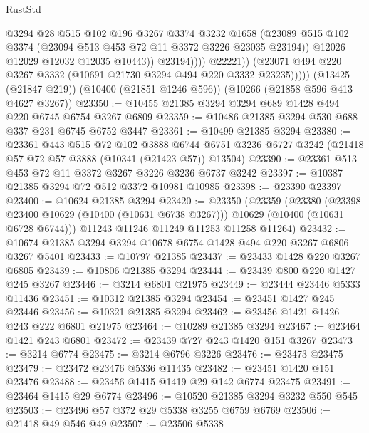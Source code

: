 \begin{lexlean}{RustStd}
\begin{coremodule}
                          @3294
                          @28
                          @515
                          @102
                          @196
                          @3267
                          @3374
                          @3232
                          @1658
                          (@23089
                            @515
                            @102
                            @3374
                            (@23094 @513 @453 @72 @11 @3372 @3226 @23035 @23194))
                          @12026
                          @12029
                          @12032
                          @12035
                          @10443))
                      @23194))))
              @22221))
          (@23071 @494 @220 @3267 @3332 (@10691 @21730 @3294 @494 @220 @3332 @23235)))))
    (@13425 (@21847 @219))
    (@10400 (@21851 @1246 @596))
    (@10266 (@21858 @596 @413 @4627 @3267))
@23350 := @10455 @21385 @3294 @3294 @689 @1428 @494 @220 @6745 @6754 @3267 @6809
@23359 := @10486 @21385 @3294 @530 @688 @337 @231 @6745 @6752 @3447
@23361 := @10499 @21385 @3294
@23380 := @23361
    @443
    @515
    @72
    @102
    @3888
    @6744
    @6751
    @3236
    @6727
    @3242
    (@21418 @57 @72 @57 @3888 (@10341 (@21423 @57)) @13504)
@23390 := @23361 @513 @453 @72 @11 @3372 @3267 @3226 @3236 @6737 @3242
@23397 := @10387 @21385 @3294 @72 @512 @3372 @10981 @10985
@23398 := @23390 @23397
@23400 := @10624 @21385 @3294
@23420 := @23350
    (@23359
      (@23380
        (@23398 @23400 @10629 (@10400 (@10631 @6738 @3267)))
        @10629
        (@10400 (@10631 @6728 @6744)))
      @11243
      @11246
      @11249
      @11253
      @11258
      @11264)
@23432 := @10674 @21385 @3294 @3294 @10678 @6754 @1428 @494 @220 @3267 @6806 @3267 @5401
@23433 := @10797 @21385
@23437 := @23433 @1428 @220 @3267 @6805
@23439 := @10806 @21385 @3294
@23444 := @23439 @800 @220 @1427 @245 @3267
@23446 := @3214 @6801 @21975
@23449 := @23444 @23446 @5333 @11436
@23451 := @10312 @21385 @3294
@23454 := @23451 @1427 @245 @23446
@23456 := @10321 @21385 @3294
@23462 := @23456 @1421 @1426 @243 @222 @6801 @21975
@23464 := @10289 @21385 @3294
@23467 := @23464 @1421 @243 @6801
@23472 := @23439 @727 @243 @1420 @151 @3267
@23473 := @3214 @6774
@23475 := @3214 @6796 @3226
@23476 := @23473 @23475
@23479 := @23472 @23476 @5336 @11435
@23482 := @23451 @1420 @151 @23476
@23488 := @23456 @1415 @1419 @29 @142 @6774 @23475
@23491 := @23464 @1415 @29 @6774
@23496 := @10520 @21385 @3294 @3232 @550 @545
@23503 := @23496 @57 @372 @29 @5338 @3255 @6759 @6769
@23506 := @21418 @49 @546 @49
@23507 := @23506 @5338

\end{coremodule}
\end{lexlean}
